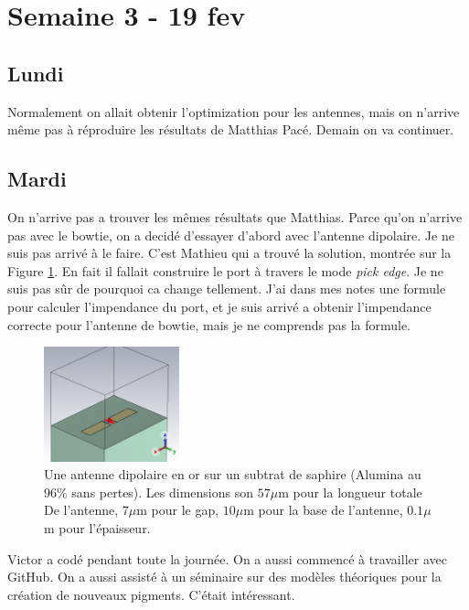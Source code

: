 \section{Semaine 3 - 19 fev}

\subsection{Lundi}

Normalement on allait obtenir l'optimization pour les antennes, mais on n'arrive même pas à
réproduire les résultats de Matthias Pacé. Demain on va continuer.

\subsection{Mardi}

On n'arrive pas a trouver les mêmes résultats que Matthias. Parce qu'on n'arrive pas avec le bowtie, on a
decidé d'essayer d'abord avec l'antenne dipolaire. Je ne suis pas arrivé à le faire. C'est Mathieu qui a 
trouvé la solution, montrée sur la Figure \ref{fig:first_dipole}. En fait il fallait construire le port à 
travers le mode \textit{pick edge}. Je ne suis pas sûr de pourquoi ca change tellement.
J'ai dans mes notes une formule pour calculer l'impendance du port, et je suis arrivé a obtenir l'impendance
correcte pour l'antenne de bowtie, mais je ne comprends pas la formule.

\begin{figure}
    \centering
    \includegraphics[width=0.35\textwidth]{texfigures/first_dipole.png}
    \caption{\label{fig:first_dipole} Une antenne dipolaire en or sur un subtrat de saphire 
    (Alumina au $96\%$ sans pertes). Les dimensions son $57\mu $m pour la longueur totale De
    l'antenne, $7\mu $m pour le gap, $10\mu $m pour la base de l'antenne, $0.1\mu $m pour l'épaisseur.}
\end{figure}

Victor a codé pendant toute la journée. On a aussi commencé à travailler avec GitHub. On a aussi assisté
à un séminaire sur des modèles théoriques pour la création de nouveaux pigments. C'était intéressant.